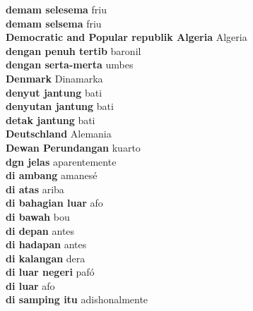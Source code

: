 \textbf{ demam selesema  } friu \\
\textbf{ demam selsema  } friu \\
\textbf{ Democratic and Popular republik Algeria  } Algeria \\
\textbf{ dengan penuh tertib  } baronil \\
\textbf{ dengan serta-merta  } umbes \\
\textbf{ Denmark  } Dinamarka \\
\textbf{ denyut jantung  } bati \\
\textbf{ denyutan jantung  } bati \\
\textbf{ detak jantung  } bati \\
\textbf{ Deutschland  } Alemania \\
\textbf{ Dewan Perundangan  } kuarto \\
\textbf{ dgn jelas  } aparentemente \\
\textbf{ di ambang  } amanesé \\
\textbf{ di atas  } ariba \\
\textbf{ di bahagian luar  } afo \\
\textbf{ di bawah  } bou \\
\textbf{ di depan  } antes \\
\textbf{ di hadapan  } antes \\
\textbf{ di kalangan  } dera \\
\textbf{ di luar negeri  } pafó \\
\textbf{ di luar  } afo \\
\textbf{ di samping itu  } adishonalmente \\
